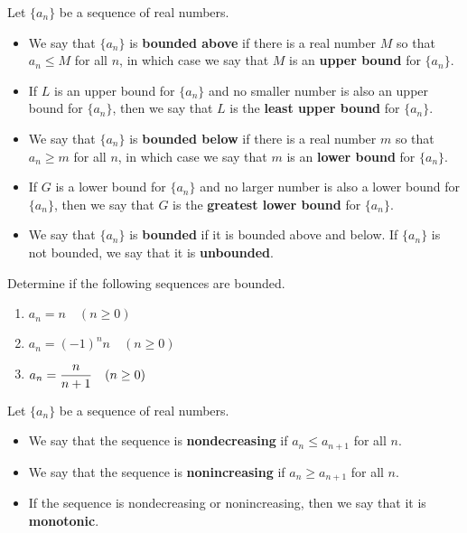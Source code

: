 \begin{definition}
Let $\{a_n\}$ be a sequence of real numbers.
\begin{itemize}
\item We say that $\{a_n\}$ is \textbf{bounded above} if there is a real number $M$ so that $a_n\le M$ for all $n$, in which case we say that $M$ is an \textbf{upper bound} for $\{a_n\}$.
\item If $L$ is an upper bound for $\{a_n\}$ and no smaller number is also an upper bound for $\{a_n\}$, then we say that $L$ is the \textbf{least upper bound} for $\{a_n\}$.
\item We say that $\{a_n\}$ is \textbf{bounded below} if there is a real number $m$ so that $a_n\ge m$ for all $n$, in which case we say that $m$ is an \textbf{lower bound} for $\{a_n\}$.
\item If $G$ is a lower bound for $\{a_n\}$ and no larger number is also a lower bound for $\{a_n\}$, then we say that $G$ is the \textbf{greatest lower bound} for $\{a_n\}$.
\item We say that $\{a_n\}$ is \textbf{bounded} if it is bounded above and below.
If $\{a_n\}$ is not bounded, we say that it is \textbf{unbounded}.
\end{itemize}
\end{definition}

\begin{example}
Determine if the following sequences are bounded.
\begin{enumerate}
\item $a_n = n\quad (n\ge 0)$
\vfill
\item $a_n=(-1)^n n\quad (n\ge 0)$
\vfill
\item $a_n =\displaystyle \frac{n}{n+1}\quad (n\ge 0)$
\vfill
\end{enumerate}
\end{example}


\newpage

\begin{definition}
Let $\{a_n\}$ be a sequence of real numbers.
\begin{itemize}
\item We say that the sequence is \textbf{nondecreasing} if $a_n\le a_{n+1}$ for all $n$.
\item We say that the sequence is \textbf{nonincreasing} if $a_n\ge a_{n+1}$ for all $n$.
\item If the sequence is nondecreasing or nonincreasing, then we say that it is \textbf{monotonic}.
\end{itemize}
\end{definition}

